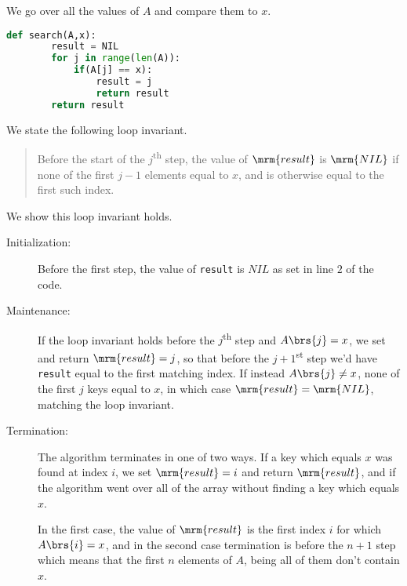 \documentclass[oneside]{scrbook}
\newcommand{\codeword}[1]{\texttt{#1}}
\theoremstyle{definition}
\begin{document}
\begin{exercise}
    We go over all the values of $A$ and compare them to $x$.

    \begin{lstlisting}[language=Python]
    def search(A,x):
        result = NIL
    	for j in range(len(A)):
    		if(A[j] == x):
    			result = j
                return result
    	return result
    \end{lstlisting}

    We state the following loop invariant.

    \begin{quote}
        Before the start of the $j$\textsuperscript{th} step, the value of $\mrm{result}$ is $\mrm{NIL}$ if none of the first $j-1$ elements equal to $x$, and is otherwise equal to the first such index.
    \end{quote}

    We show this loop invariant holds.

    \begin{description}
        \item[Initialization:]
        Before the first step, the value of \codeword{result} is $NIL$ as set in line $2$ of the code.

        \item[Maintenance:]
        If the loop invariant holds before the $j$\textsuperscript{th} step and $A\brs{j} = x$, we set and return $\mrm{result} = j$, so that before the $j+1$\textsuperscript{st} step we'd have \codeword{result} equal to the first matching index.
        If instead $A\brs{j} \neq x$, none of the first $j$ keys equal to $x$, in which case $\mrm{result} = \mrm{NIL}$, matching the loop invariant.

        \item[Termination:]
        The algorithm terminates in one of two ways. If a key which equals $x$ was found at index $i$, we set $\mrm{result} = i$ and return $\mrm{result}$, and if the algorithm went over all of the array without finding a key which equals $x$.

        In the first case, the value of $\mrm{result}$ is the first index $i$ for which $A\brs{i} = x$, and in the second case termination is before the $n+1$ step which means that the first $n$ elements of $A$, being all of them don't contain $x$.
    \end{description}
\end{exercise}
\end{document}

